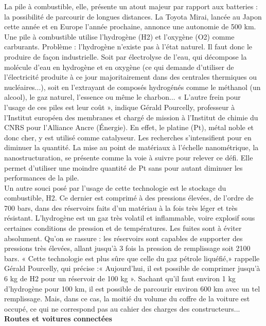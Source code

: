 \documentclass[8pt]{article}
\begin{document}
La pile à combustible, elle, présente un atout majeur par rapport aux batteries : la possibilité de parcourir de longues distances. La Toyota Mirai, lancée au Japon cette année et en Europe l’année prochaine, annonce une autonomie de 500 km. Une pile à combustible utilise l’hydrogène (H2) et l’oxygène (O2) comme carburants. Problème : l’hydrogène n’existe pas à l’état naturel. Il faut donc le produire de façon industrielle. Soit par électrolyse de l'eau, qui décompose la molécule d’eau en hydrogène et en oxygène (ce qui demande d'utiliser de l’électricité produite à ce jour majoritairement dans des centrales thermiques ou nucléaires...), soit en l’extrayant de composés hydrogénés comme le méthanol (un alcool), le gaz naturel, l’essence ou même le charbon... « L'autre frein pour l’usage de ces piles est leur coût », indique Gérald Pourcelly, professeur à l’Institut européen des membranes et chargé de mission à l’Institut de chimie du CNRS pour l’Alliance Ancre (Énergie). En effet, le platine (Pt), métal noble et donc cher, y est utilisé comme catalyseur. Les recherches s’intensifient pour en diminuer la quantité. La mise au point de matériaux à l’échelle nanométrique, la nanostructuration, se présente comme la voie à suivre pour relever ce défi. Elle permet d’utiliser une moindre quantité de Pt sans pour autant diminuer les performances de la pile.\\

Un autre souci posé par l’usage de cette technologie est le stockage du combustible, H2. Ce dernier est comprimé à des pressions élevées, de l’ordre de 700 bars, dans des réservoirs faits d’un matériau à la fois très léger et très résistant. L’hydrogène est un gaz très volatil et inflammable, voire explosif sous certaines conditions de pression et de températures. Les fuites sont à éviter absolument. Qu'on se rassure : les réservoirs sont capables de supporter des pressions très élevées, allant jusqu’à 3 fois la pression de remplissage soit 2100 bars. « Cette technologie est plus sûre que celle du gaz pétrole liquéfié,» rappelle Gérald Pourcelly, qui précise :« Aujourd’hui, il est possible de comprimer jusqu’à 6 kg de H2 pour un réservoir de 100 kg ». Sachant qu’il faut environ 1 kg d’hydrogène pour 100 km, il est possible de parcourir environ 600 km avec un tel remplissage. Mais, dans ce cas, la moitié du volume du coffre de la voiture est occupé, ce qui ne correspond pas au cahier des charges des constructeurs...\\

\textbf{Routes et voitures connectées}
\end{document}
